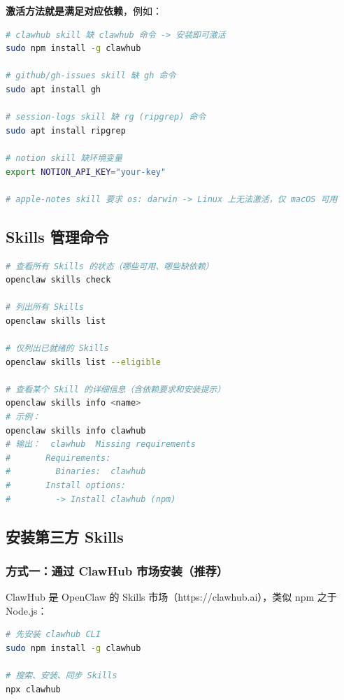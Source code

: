 \textbf{激活方法就是满足对应依赖}，例如：

\begin{lstlisting}[language=bash]
# clawhub skill 缺 clawhub 命令 -> 安装即可激活
sudo npm install -g clawhub

# github/gh-issues skill 缺 gh 命令
sudo apt install gh

# session-logs skill 缺 rg (ripgrep) 命令
sudo apt install ripgrep

# notion skill 缺环境变量
export NOTION_API_KEY="your-key"

# apple-notes skill 要求 os: darwin -> Linux 上无法激活，仅 macOS 可用
\end{lstlisting}

\subsection{Skills 管理命令}


\begin{lstlisting}[language=bash]
# 查看所有 Skills 的状态（哪些可用、哪些缺依赖）
openclaw skills check

# 列出所有 Skills
openclaw skills list

# 仅列出已就绪的 Skills
openclaw skills list --eligible

# 查看某个 Skill 的详细信息（含依赖要求和安装提示）
openclaw skills info <name>
# 示例：
openclaw skills info clawhub
# 输出：  clawhub  Missing requirements
#       Requirements:
#         Binaries:  clawhub
#       Install options:
#         -> Install clawhub (npm)
\end{lstlisting}

\subsection{安装第三方 Skills}


\subsubsection{方式一：通过 ClawHub 市场安装（推荐）}


ClawHub 是 OpenClaw 的 Skills 市场（https://clawhub.ai），类似 npm 之于 Node.js：

\begin{lstlisting}[language=bash]
# 先安装 clawhub CLI
sudo npm install -g clawhub

# 搜索、安装、同步 Skills
npx clawhub
\end{lstlisting}

